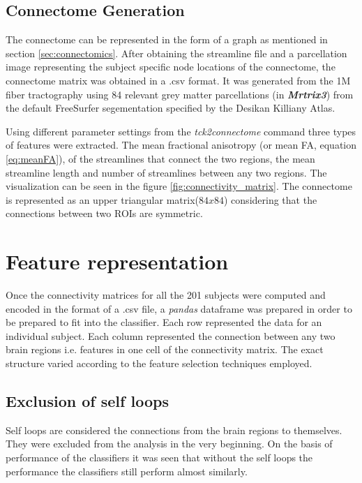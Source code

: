 \documentclass[msthesis.tex]{subfiles}
\begin{document}
\subsection{Connectome Generation}

The connectome can be represented in the form of a graph as mentioned in section \ref{sec:connectomics}. After obtaining the streamline file and a parcellation image representing the subject specific node locations of the connectome, the connectome matrix was obtained in a .csv format. It was generated from the 1M fiber tractography using 84 relevant grey matter parcellations (in \textit{\textbf{Mrtrix3}}) from the default FreeSurfer segementation specified by the Desikan Killiany Atlas. 

Using different parameter settings from the \textit{tck2connectome} command three types of features  were extracted. The mean fractional anisotropy (or mean FA, equation \ref{eq:meanFA}), of the streamlines that connect the two regions, the mean streamline length and number of streamlines between any two regions. The visualization can be seen in the figure \ref{fig:connectivity_matrix}. The connectome is represented as an upper triangular matrix($84 x 84$) considering that the connections between two ROIs are symmetric.

\section{Feature representation}
Once the connectivity matrices for all the 201 subjects were computed and encoded in the format of a .csv file, a \textit{pandas} dataframe was prepared in order to be prepared to fit into the classifier. Each row represented the data for an individual subject. Each column represented the connection between any two brain regions i.e. features in one cell of the connectivity matrix. The exact structure varied according to the feature selection techniques employed.

\subsection{Exclusion of self loops}
Self loops are considered the connections from the brain regions to themselves. They were excluded from the analysis in the very beginning. On the basis of performance of the classifiers it was seen that without the self loops the performance the classifiers still perform almost similarly.
\end{document}
